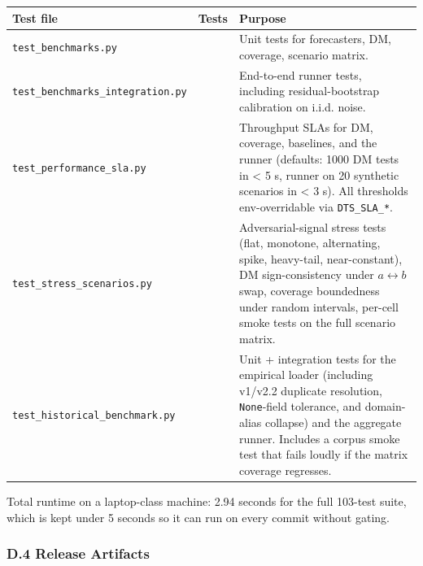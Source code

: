 \documentclass[
]{article}
\begin{document}
\begin{longtable}[]{@{}
  >{\raggedright\arraybackslash}p{}
  >{\raggedright\arraybackslash}p{}
  >{\raggedright\arraybackslash}p{}@{}}
\toprule\noalign{}
\begin{minipage}[b]{\linewidth}\raggedright
Test file
\end{minipage} & \begin{minipage}[b]{\linewidth}\raggedright
Tests
\end{minipage} & \begin{minipage}[b]{\linewidth}\raggedright
Purpose
\end{minipage} \\
\midrule\noalign{}
\endhead
\bottomrule\noalign{}
\endlastfoot
\texttt{test\_benchmarks.py} & 18 & Unit tests for forecasters, DM,
coverage, scenario matrix. \\
\texttt{test\_benchmarks\_integration.py} & 8 & End-to-end runner tests,
including residual-bootstrap calibration on i.i.d. noise. \\
\texttt{test\_performance\_sla.py} & 5 & Throughput SLAs for DM,
coverage, baselines, and the runner (defaults: 1000 DM tests in
\textless{} 5 s, runner on 20 synthetic scenarios in \textless{} 3 s).
All thresholds env-overridable via \texttt{DTS\_SLA\_*}. \\
\texttt{test\_stress\_scenarios.py} & 57 & Adversarial-signal stress
tests (flat, monotone, alternating, spike, heavy-tail, near-constant),
DM sign-consistency under \(a \leftrightarrow b\) swap, coverage
boundedness under random intervals, per-cell smoke tests on the full
scenario matrix. \\
\texttt{test\_historical\_benchmark.py} & 15 & Unit + integration tests
for the empirical loader (including v1/v2.2 duplicate resolution,
\texttt{None}-field tolerance, and domain-alias collapse) and the
aggregate runner. Includes a corpus smoke test that fails loudly if the
matrix coverage regresses. \\
\end{longtable}

Total runtime on a laptop-class machine: 2.94 seconds for the full
103-test suite, which is kept under 5 seconds so it can run on every
commit without gating.

\subsubsection{D.4 Release Artifacts}\label{d.4-release-artifacts}
\end{document}

